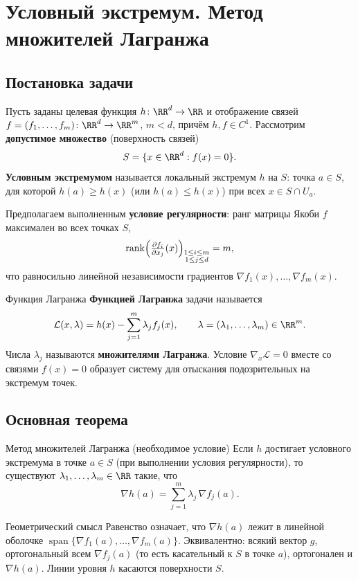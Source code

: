 
\section{Условный экстремум. Метод множителей Лагранжа}

\subsection*{Постановка задачи}

Пусть заданы целевая функция $h\colon\RR^d\to\RR$ и отображение связей
$f=(f_1,\dots,f_m)\colon\RR^d\to\RR^m$, $m<d$, причём $h,f\in C^1$. Рассмотрим
\textbf{допустимое множество} (поверхность связей)
\[
S=\{x\in\RR^d:f(x)=0\}.
\]
\textbf{Условным экстремумом} называется локальный экстремум $h$ на $S$: точка
$a\in S$, для которой $h(a)\ge h(x)$ (или $h(a)\le h(x)$) при всех $x\in S\cap U_a$.

Предполагаем выполненным \textbf{условие регулярности}: ранг матрицы Якоби $f$
максимален во всех точках $S$,
\[
\operatorname{rank}\Bigl(\tfrac{\partial f_i}{\partial x_j}(x)\Bigr)_{\substack{1\le i\le m\\1\le j\le d}}=m,
\]
что равносильно линейной независимости градиентов $\nabla f_1(x),\dots,\nabla f_m(x)$.

\begin{Definition}{Функция Лагранжа}{}
	\textbf{Функцией Лагранжа} задачи называется
	\[
	\mathcal L(x,\lambda)=h(x)-\sum_{j=1}^{m}\lambda_j f_j(x),\qquad\lambda=(\lambda_1,\dots,\lambda_m)\in\RR^m.
	\]
	Числа $\lambda_j$ называются \textbf{множителями Лагранжа}. Условие
	$\nabla_x\mathcal L=0$ вместе со связями $f(x)=0$ образует систему для отыскания
	подозрительных на экстремум точек.
\end{Definition}

\subsection*{Основная теорема}

\begin{Theorem}{Метод множителей Лагранжа (необходимое условие)}{}
	Если $h$ достигает условного экстремума в точке $a\in S$ (при выполнении условия
	регулярности), то существуют $\lambda_1,\dots,\lambda_m\in\RR$ такие, что
	\[
	\nabla h(a)=\sum_{j=1}^{m}\lambda_j\,\nabla f_j(a).
	\]
\end{Theorem}

\begin{Remark}{Геометрический смысл}{}
	Равенство означает, что $\nabla h(a)$ лежит в линейной оболочке
	$\operatorname{span}\{\nabla f_1(a),\dots,\nabla f_m(a)\}$. Эквивалентно: всякий
	вектор $g$, ортогональный всем $\nabla f_j(a)$ (то есть касательный к $S$ в точке
	$a$), ортогонален и $\nabla h(a)$. Линии уровня $h$ касаются поверхности $S$.
\end{Remark}

